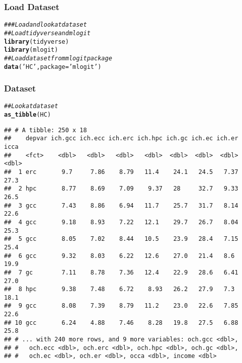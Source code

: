 \documentclass{beamer}\usepackage[]{graphicx}\usepackage[]{color}
\makeatletter
\newcommand{\hlstr}[1]{\textcolor[rgb]{0.192,0.494,0.8}{#1}}%
\newcommand{\hlcom}[1]{\textcolor[rgb]{0.678,0.584,0.686}{\textit{#1}}}%
\newcommand{\hlstd}[1]{\textcolor[rgb]{0.345,0.345,0.345}{#1}}%
\newcommand{\hlkwc}[1]{\textcolor[rgb]{0.333,0.667,0.333}{#1}}%
\newcommand{\hlkwd}[1]{\textcolor[rgb]{0.737,0.353,0.396}{\textbf{#1}}}%
\newenvironment{kframe}{%
 \def\at@end@of@kframe{}%
 \ifinner\ifhmode%
  \def\at@end@of@kframe{\end{minipage}}%
  \begin{minipage}{\columnwidth}%
 \fi\fi%
 \def\FrameCommand##1{\hskip\@totalleftmargin \hskip-\fboxsep
 \colorbox{shadecolor}{##1}\hskip-\fboxsep
     \hskip-\linewidth \hskip-\@totalleftmargin \hskip\columnwidth}%
 \MakeFramed {\advance\hsize-\width
   \@totalleftmargin\z@ \linewidth\hsize
   \@setminipage}}%
 {\par\unskip\endMakeFramed%
 \at@end@of@kframe}
\newenvironment{knitrout}{}{} %
\makeatother
\begin{document}
\begin{frame}[fragile]\frametitle{Load Dataset}
\begin{knitrout}\footnotesize
{}\color{fgcolor}\begin{kframe}
\begin{alltt}
\hlcom{### Load and look at dataset}
\hlcom{## Load tidyverse and mlogit}
\hlkwd{library}\hlstd{(tidyverse)}
\hlkwd{library}\hlstd{(mlogit)}
\hlcom{## Load dataset from mlogit package}
\hlkwd{data}\hlstd{(}\hlstr{'HC'}\hlstd{,} \hlkwc{package} \hlstd{=} \hlstr{'mlogit'}\hlstd{)}
\end{alltt}
\end{kframe}
\end{knitrout}
\end{frame}

\begin{frame}[fragile]\frametitle{Dataset}
\begin{knitrout}\footnotesize
{}\color{fgcolor}\begin{kframe}
\begin{alltt}
\hlcom{## Look at dataset}
\hlkwd{as_tibble}\hlstd{(HC)}
\end{alltt}
\begin{verbatim}
## # A tibble: 250 x 18
##    depvar ich.gcc ich.ecc ich.erc ich.hpc ich.gc ich.ec ich.er  icca
##    <fct>    <dbl>   <dbl>   <dbl>   <dbl>  <dbl>  <dbl>  <dbl> <dbl>
##  1 erc       9.7     7.86    8.79   11.4    24.1   24.5   7.37  27.3
##  2 hpc       8.77    8.69    7.09    9.37   28     32.7   9.33  26.5
##  3 gcc       7.43    8.86    6.94   11.7    25.7   31.7   8.14  22.6
##  4 gcc       9.18    8.93    7.22   12.1    29.7   26.7   8.04  25.3
##  5 gcc       8.05    7.02    8.44   10.5    23.9   28.4   7.15  25.4
##  6 gcc       9.32    8.03    6.22   12.6    27.0   21.4   8.6   19.9
##  7 gc        7.11    8.78    7.36   12.4    22.9   28.6   6.41  27.0
##  8 hpc       9.38    7.48    6.72    8.93   26.2   27.9   7.3   18.1
##  9 gcc       8.08    7.39    8.79   11.2    23.0   22.6   7.85  22.6
## 10 gcc       6.24    4.88    7.46    8.28   19.8   27.5   6.88  25.8
## # ... with 240 more rows, and 9 more variables: och.gcc <dbl>,
## #   och.ecc <dbl>, och.erc <dbl>, och.hpc <dbl>, och.gc <dbl>,
## #   och.ec <dbl>, och.er <dbl>, occa <dbl>, income <dbl>
\end{verbatim}
\end{kframe}
\end{knitrout}
\end{frame}
\end{document}
